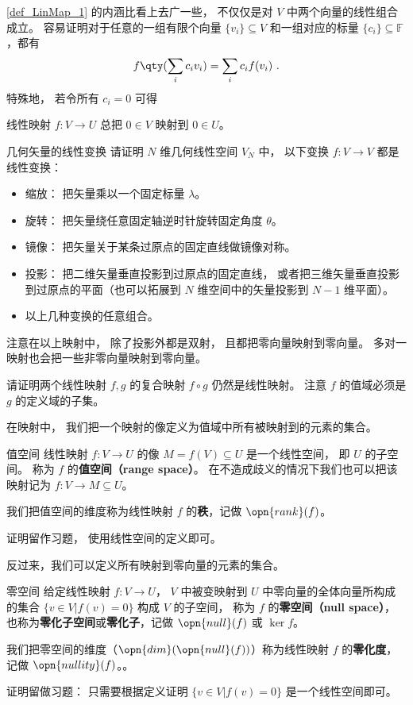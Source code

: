 \autoref{def_LinMap_1} 的内涵比看上去广一些， 不仅仅是对 $V$ 中两个向量的线性组合成立。 容易证明对于任意的一组有限个向量 $\{v_i\}\subseteq V$ 和一组对应的标量 $\{c_i\}\subseteq\mathbb{F}$，都有
\begin{equation}\label{eq_LinMap_1}
f\qty(\sum_i c_i v_i)=\sum_i c_i f(v_i)~.
\end{equation}
特殊地， 若令所有 $c_i = 0$ 可得
\begin{corollary}{}\label{cor_LinMap_1}
线性映射 $f:V\to U$ 总把 $0 \in V$ 映射到 $0 \in U$。
\end{corollary}

\begin{exercise}{几何矢量的线性变换}
请证明 $N$ 维几何线性空间 $V_N$ 中， 以下变换 $f:V\to V$ 都是线性变换：
\begin{itemize}
\item 缩放： 把矢量乘以一个固定标量 $\lambda$。
\item 旋转： 把矢量绕任意固定轴逆时针旋转固定角度 $\theta$。
\item 镜像： 把矢量关于某条过原点的固定直线做镜像对称。
\item 投影： 把二维矢量垂直投影到过原点的固定直线， 或者把三维矢量垂直投影到过原点的平面（也可以拓展到 $N$ 维空间中的矢量投影到 $N-1$ 维平面）。
\item 以上几种变换的任意组合。
\end{itemize}
\end{exercise}
注意在以上映射中， 除了投影外都是双射， 且都把零向量映射到零向量。 多对一映射也会把一些非零向量映射到零向量。

\begin{exercise}{}
请证明两个线性映射 $f, g$ 的复合映射 $f \circ g$ 仍然是线性映射。 注意 $f$ 的值域必须是 $g$ 的定义域的子集。
\end{exercise}

在映射中， 我们把一个映射的像定义为值域中所有被映射到的元素的集合。
\begin{definition}{值空间}\label{def_LinMap_3}
线性映射 $f:V\to U$ 的像 $M = f(V) \subseteq U$ 是一个线性空间， 即 $U$ 的子空间。 称为 $f$ 的\textbf{值空间（range space）}。 在不造成歧义的情况下我们也可以把该映射记为 $f: V\to M \subseteq U$。

我们把值空间的维度称为线性映射 $f$ 的\textbf{秩}，记做 $\opn{rank}(f)$。
\end{definition}
证明留作习题， 使用线性空间的定义即可。

反过来，我们可以定义所有映射到零向量的元素的集合。
\begin{definition}{零空间}\label{def_LinMap_2}
给定线性映射 $f:V\to U$， $V$ 中被变映射到 $U$ 中零向量的全体向量所构成的集合 $\{v\in V|f(v)= 0\}$ 构成 $V$ 的子空间， 称为 $f$ 的\textbf{零空间（null space）}， 也称为\textbf{零化子空间}或\textbf{零化子}，记做 $\opn{null} (f)$ 或 $\ker{f}$。

我们把零空间的维度（$\opn{dim}(\opn{null}(f))$）称为线性映射 $f$ 的\textbf{零化度}，记做 $\opn{nullity}(f)$。。
\end{definition}
证明留做习题： 只需要根据定义证明 $\{v\in V|f(v)= 0\}$ 是一个线性空间即可。 


